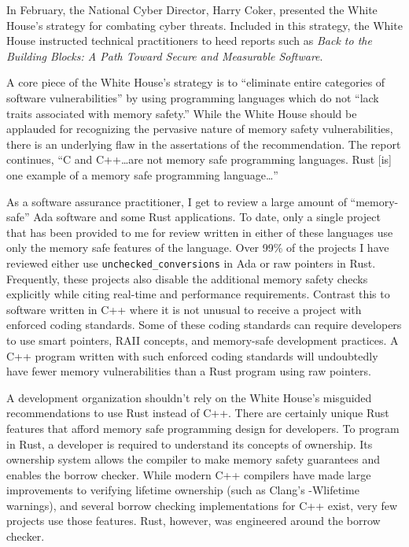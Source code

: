In February, the National Cyber Director, Harry Coker, presented the White House's strategy for combating cyber threats. Included in this strategy, the White House instructed technical practitioners to heed reports such as \textit{Back to the Building Blocks: A Path Toward Secure and Measurable Software}.\autocite{20240902:coker}

A core piece of the White House's strategy is to ``eliminate entire categories of software vulnerabilities'' by using programming languages which do not ``lack traits associated with memory safety.''\autocite[\pno~7]{20240902:whitehouse} While the White House should be applauded for recognizing the pervasive nature of memory safety vulnerabilities, there is an underlying flaw in the assertations of the recommendation. The report continues, ``C and C++\ldots are not memory safe programming languages. Rust [is] one example of a memory safe programming language\ldots''\autocite[\pno~9]{20240902:whitehouse}

As a software assurance practitioner, I get to review a large amount of ``memory-safe'' Ada software and some Rust applications. To date, only a single project that has been provided to me for review written in either of these languages use only the memory safe features of the language. Over 99\% of the projects I have reviewed either use \texttt{unchecked\_conversions} in Ada\autocite{20240902:hood} or raw pointers in Rust. Frequently, these projects also disable the additional memory safety checks explicitly while citing real-time and performance requirements. Contrast this to software written in C++ where it is not unusual to receive a project with enforced coding standards. Some of these coding standards can require developers to use smart pointers, RAII concepts, and memory-safe development practices. A C++ program written with such enforced coding standards will undoubtedly have fewer memory vulnerabilities than a Rust program using raw pointers.

A development organization shouldn't rely on the White House's misguided recommendations to use Rust instead of C++. There are certainly unique Rust features that afford memory safe programming design for developers. To program in Rust, a developer is required to understand its concepts of ownership. Its ownership system allows the compiler to make memory safety guarantees and enables the borrow checker. While modern C++ compilers have made large improvements to verifying lifetime ownership (such as Clang's -Wlifetime warnings), and several borrow checking implementations for C++ exist, very few projects use those features. Rust, however, was engineered around the borrow checker.

